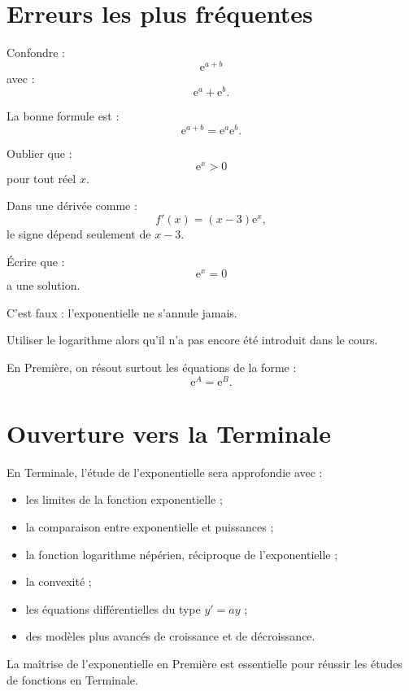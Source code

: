 \documentclass[11pt,a4paper]{article}
\newcommand{\e}{\mathrm{e}}
\begin{document}
\section{Erreurs les plus fréquentes}

\begin{erreur}
Confondre :
\[
\e^{a+b}
\]
avec :
\[
\e^a+\e^b.
\]

La bonne formule est :
\[
\e^{a+b}=\e^a\e^b.
\]
\end{erreur}

\begin{erreur}
Oublier que :
\[
\e^x>0
\]
pour tout réel $x$.

Dans une dérivée comme :
\[
f'(x)=(x-3)\e^x,
\]
le signe dépend seulement de $x-3$.
\end{erreur}

\begin{erreur}
Écrire que :
\[
\e^x=0
\]
a une solution.

C'est faux : l'exponentielle ne s'annule jamais.
\end{erreur}

\begin{erreur}
Utiliser le logarithme alors qu'il n'a pas encore été introduit dans le cours.

En Première, on résout surtout les équations de la forme :
\[
\e^A=\e^B.
\]
\end{erreur}

\section{Ouverture vers la Terminale}

En Terminale, l'étude de l'exponentielle sera approfondie avec :
\begin{itemize}
    \item les limites de la fonction exponentielle ;
    \item la comparaison entre exponentielle et puissances ;
    \item la fonction logarithme népérien, réciproque de l'exponentielle ;
    \item la convexité ;
    \item les équations différentielles du type $y'=ay$ ;
    \item des modèles plus avancés de croissance et de décroissance.
\end{itemize}

\begin{pointbac}
La maîtrise de l'exponentielle en Première est essentielle pour réussir les études de fonctions en Terminale.
\end{pointbac}
\end{document}
